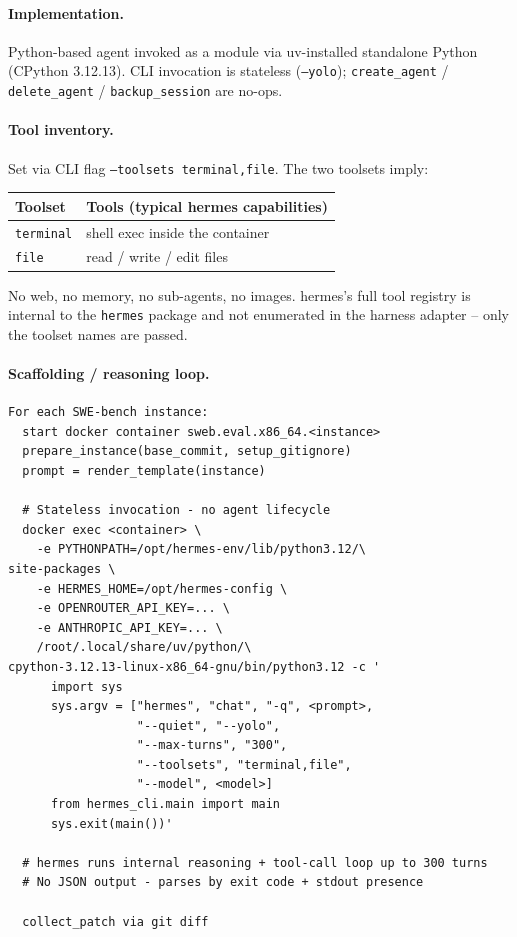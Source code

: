 \documentclass{llmxive}
\begin{document}
\paragraph{Implementation.}
Python-based agent invoked as a module via uv-installed standalone Python (CPython 3.12.13). CLI invocation is stateless (\texttt{--yolo}); \texttt{create\_agent} / \texttt{delete\_agent} / \texttt{backup\_session} are no-ops.

\paragraph{Tool inventory.}
Set via CLI flag \texttt{--toolsets terminal,file}. The two toolsets imply:

\begin{center}
\begin{tabular}{ll}
\toprule
\textbf{Toolset} & \textbf{Tools (typical hermes capabilities)} \\
\midrule
\texttt{terminal} & shell exec inside the container \\
\texttt{file}     & read / write / edit files \\
\bottomrule
\end{tabular}
\end{center}

No web, no memory, no sub-agents, no images. hermes's full tool registry is internal to the \texttt{hermes} package and not enumerated in the harness adapter -- only the toolset names are passed.

\paragraph{Scaffolding / reasoning loop.}
\begin{verbatim}
For each SWE-bench instance:
  start docker container sweb.eval.x86_64.<instance>
  prepare_instance(base_commit, setup_gitignore)
  prompt = render_template(instance)

  # Stateless invocation - no agent lifecycle
  docker exec <container> \
    -e PYTHONPATH=/opt/hermes-env/lib/python3.12/\
site-packages \
    -e HERMES_HOME=/opt/hermes-config \
    -e OPENROUTER_API_KEY=... \
    -e ANTHROPIC_API_KEY=... \
    /root/.local/share/uv/python/\
cpython-3.12.13-linux-x86_64-gnu/bin/python3.12 -c '
      import sys
      sys.argv = ["hermes", "chat", "-q", <prompt>,
                  "--quiet", "--yolo",
                  "--max-turns", "300",
                  "--toolsets", "terminal,file",
                  "--model", <model>]
      from hermes_cli.main import main
      sys.exit(main())'

  # hermes runs internal reasoning + tool-call loop up to 300 turns
  # No JSON output - parses by exit code + stdout presence

  collect_patch via git diff
\end{verbatim}
\end{document}
